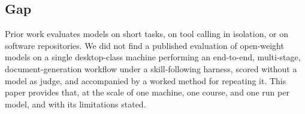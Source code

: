 \subsection{Gap}

Prior work evaluates models on short tasks, on tool calling in isolation, or on software repositories. We did not find a published evaluation of open-weight models on a single desktop-class machine performing an end-to-end, multi-stage, document-generation workflow under a skill-following harness, scored without a model as judge, and accompanied by a worked method for repeating it. This paper provides that, at the scale of one machine, one course, and one run per model, and with its limitations stated.

